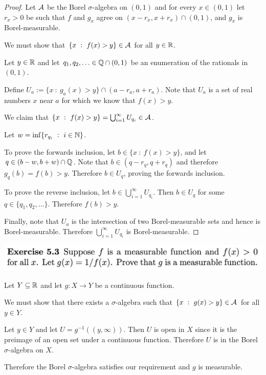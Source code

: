 \begin{proof}
  Let $\mathcal A$ be the Borel $\sigma$-algebra on $(0, 1)$ and for every $x \in (0, 1)$ let $r_x > 0$ be such
  that $f$ and $g_x$ agree on $(x - r_x, x + r_x) \cap (0, 1)$, and $g_x$ is Borel-measurable.

  We must show that $\{x ~:~ f(x) > y\} \in \mathcal A$ for all $y \in \mathbb{R}$.

  Let $y \in \mathbb{R}$ and let $q_1, q_2, \ldots \in \mathbb{Q} \cap (0, 1)$ be an enumeration of the rationals in $(0, 1)$.

  Define $U_{a} := \{x ~:~ g_{a}(x) > y\} \cap (a - r_{a}, a + r_{a})$. Note that $U_a$ is a set of real
  numbers $x$ near $a$ for which we know that $f(x) > y$.

  We claim that $\{x ~:~ f(x) > y\} = \bigcup_{i=1}^\infty U_{q_i} \in \mathcal A$.

  Let $w = \inf \{r_{q_i} ~:~ i \in \mathbb{N} \}$.

  To prove the forwards inclusion, let $b \in \{x ~:~ f(x) > y\}$, and let $q \in (b - w, b + w) \cap \mathbb{Q}$. Note
  that $b \in (q - r_q, q + r_q)$ and therefore $g_q(b) = f(b) > y$. Therefore $b \in U_q$, proving the
  forwards inclusion.

  To prove the reverse inclusion, let $b \in \bigcup_{i=1}^\infty U_{q_i}$. Then $b \in U_q$ for
  some $q \in \{q_1, q_2, \ldots\}$. Therefore $f(b) > y$.

  Finally, note that $U_a$ is the intersection of two Borel-measurable sets and hence is Borel-measurable.
  Therefore $\bigcup_{i=1}^\infty U_{q_i}$ is Borel-measurable.
\end{proof}



\newpage
\begin{mdframed}
\includegraphics[width=400pt]{img/analysis--berkeley-202a-hw06-b799.png}
\end{mdframed}

\begin{lemma*}\label{lemma-continuous-function-is-measurable}
  Let $Y \subseteq \mathbb{R}$ and let $g: X \to Y$ be a continuous function.

  We must show that there exists a $\sigma$-algebra such that $\{x ~:~ g(x) > y\} \in \mathcal A$ for all $y \in Y$.

  Let $y \in Y$ and let $U = g^{-1}((y, \infty))$. Then $U$ is open in $X$ since it is the preimage of an open
  set under a continuous function. Therefore $U$ is in the Borel $\sigma$-algebra on $X$.

  Therefore the Borel $\sigma$-algebra satisfies our requirement and $g$ is measurable.
\end{lemma*}


